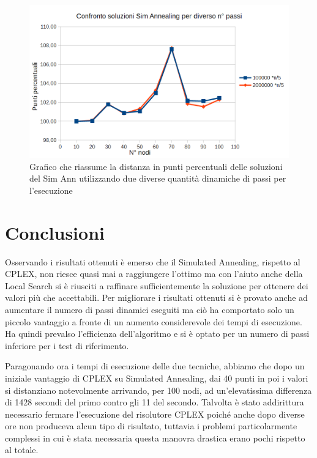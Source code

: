 \documentclass[preprint,12pt]{elsarticle}
\begin{document}
\begin{figure}[htbp]
\centering
\includegraphics[scale=0.50]{grafici_confronti/confronto_soluzioni_passi.png} 
\caption{Grafico che riassume la distanza in punti percentuali delle soluzioni del Sim Ann utilizzando due diverse quantità dinamiche di passi per l'esecuzione}\label{fig:10}
\end{figure}

\section{Conclusioni}
\label{S:5}

Osservando i risultati ottenuti è emerso che il Simulated Annealing, rispetto al CPLEX, non riesce quasi mai a raggiungere l'ottimo ma con l'aiuto anche della Local Search si è riusciti a raffinare sufficientemente la soluzione per ottenere dei valori più che accettabili. Per migliorare i risultati ottenuti si è provato anche ad aumentare il numero di passi dinamici eseguiti ma ciò ha comportato solo un piccolo vantaggio a fronte di un aumento considerevole dei tempi di esecuzione. Ha quindi prevalso l'efficienza dell'algoritmo e si è optato per un numero di passi inferiore per i test di riferimento. 

Paragonando ora i tempi di esecuzione delle due tecniche, abbiamo che dopo un iniziale vantaggio di CPLEX su Simulated Annealing, dai 40 punti in poi i valori si distanziano notevolmente arrivando, per 100 nodi, ad un'elevatissima differenza di 1428 secondi del primo contro gli 11 del secondo. Talvolta è stato addirittura necessario fermare l'esecuzione del risolutore CPLEX poiché anche dopo diverse ore non produceva alcun tipo di risultato, tuttavia i problemi particolarmente complessi in cui è stata necessaria questa manovra drastica erano pochi rispetto al totale. 
\end{document}
